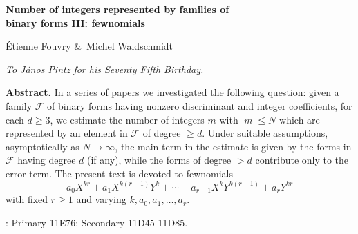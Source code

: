 \documentclass[10pt]{article}
\theoremstyle{definition}
\numberwithin{equation}{section}
\newcommand{\calF}{\mathcal {F}}
\begin{document}
 


\baselineskip=14pt
 
 
\author{\'Etienne Fouvry\\
Univ. Paris--Saclay, CNRS \\
Laboratoire de Math\' ematiques d'Orsay \\
91405 Orsay, France \\
E-mail: Etienne.Fouvry@universite-paris-saclay.fr
\and 
Michel Waldschmidt\\
Sorbonne Universit\' e \\
CNRS, IMJ--PRG \\
75005 Paris, France\\
E-mail: michel.waldschmidt@imj-prg.fr}
 

\renewcommand{\thefootnote}{\arabic{footnote}}
\setcounter{footnote}{0}

\begin{center}
\Large\bf 
{\bf Number of integers represented by
 families of 
 \\
binary forms III: fewnomials
 } 
\\
 

\bigskip

{\sc \small \'Etienne Fouvry \&\ Michel Waldschmidt}

\end{center}
 
 \bigskip
 
\hfill 
{\em 
To J\'anos Pintz for his Seventy Fifth Birthday.}


 
 \bigskip
   
\noindent
{\bf Abstract.} In a series of papers we investigated the following question: 
given a family $\calF$ of binary forms having nonzero discriminant and integer coefficients, for each $d\geqslant 3$, we estimate the number of integers $m$ with $|m|\leqslant N$ which are represented by an element in $\calF$ of degree $\geqslant d$. Under suitable assumptions, asymptotically as $N\to\infty$, the main term in the estimate is given by the forms in $\calF$ having degree $d$ (if any), while the forms of degree $>d$ contribute only to the error term. 
The present text is devoted to fewnomials
\[
a_0X^{kr}+a_1X^{k(r-1)}Y^k+\cdots +a_{r-1}X^kY^{k(r-1)}+a_rY^{kr}
\]
with fixed $r\geqslant 1$ and varying $k,a_0,a_1,\dots,a_r$.


 \bigskip

 
: Primary 11E76; Secondary 11D45 11D85.
\end{document}
